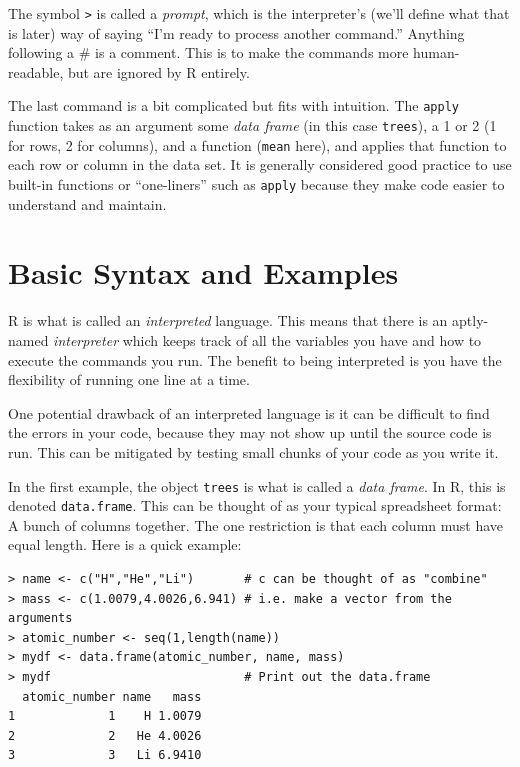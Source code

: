 \documentclass[12pt]{article}
\begin{document}
The symbol \verb|>| is called a \emph{prompt}, which is the interpreter's (we'll define what that is later) way of saying ``I'm ready to process another command.'' Anything following a \# is a comment. This is to make the commands more human-readable, but are ignored by R entirely.

The last command is a bit complicated but fits with intuition. The \verb|apply| function takes as an argument some \emph{data frame} (in this case \verb|trees|), a 1 or 2 (1 for rows, 2 for columns), and a function (\verb|mean| here), and applies that function to each row or column in the data set. It is generally considered good practice to use built-in functions or ``one-liners'' such as \verb|apply| because they make code easier to understand and maintain.

\section{Basic Syntax and Examples}

R is what is called an \emph{interpreted} language. This means that there is an aptly-named \emph{interpreter} which keeps track of all the variables you have and how to execute the commands you run. The benefit to being interpreted is you have the flexibility of running one line at a time.

One potential drawback of an interpreted language is it can be difficult to find the errors in your code, because they may not show up until the source code is run. This can be mitigated by testing small chunks of your code as you write it.

In the first example, the object \verb|trees| is what is called a \emph{data frame}. In R, this is denoted \verb|data.frame|. This can be thought of as your typical spreadsheet format: A bunch of columns together. The one restriction is that each column must have equal length. Here is a quick example:

\begin{Verbatim}[frame=single, fontsize=\small]
> name <- c("H","He","Li")       # c can be thought of as "combine"
> mass <- c(1.0079,4.0026,6.941) # i.e. make a vector from the arguments
> atomic_number <- seq(1,length(name))
> mydf <- data.frame(atomic_number, name, mass)
> mydf                           # Print out the data.frame
  atomic_number name   mass
1             1    H 1.0079
2             2   He 4.0026
3             3   Li 6.9410
\end{Verbatim}
\end{document}
